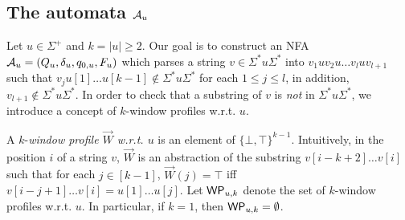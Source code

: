 \documentclass{llncs}
\begin{document}
\subsection{The automata $\mathcal{A}_u$}

Let $u \in \Sigma^+$ and $k=|u| \ge 2$.
Our goal is to construct an NFA $\mathcal{A}_u=(Q_u, \delta_u, q_{0,u}, F_u)$ which parses a string $v \in \Sigma^\ast u \Sigma^\ast$ into $v_1 u v_2 u \dots v_l u v_{l+1}$ such that $v_j u[1] \dots u[k-1] \not \in \Sigma^\ast u \Sigma^\ast$ for each $1 \le j \le l$, in addition, $v_{l+1} \not \in \Sigma^\ast u \Sigma^\ast$. 
In order to check that a substring of $v$ is \emph{not} in $\Sigma^\ast u \Sigma^\ast$, we introduce a concept of $k$-window profiles w.r.t. $u$.





A $k$-\emph{window profile $\vec{W}$ w.r.t. $u$} is an element of $\{\bot,\top\}^{k-1}$. Intuitively, in the position $i$ of a string $v$, $\vec{W}$ is an abstraction of the substring $v[i-k+2] \dots v[i]$ such that for each $j \in [k-1]$, $\vec{W}(j) = \top$ iff $v[i-j+1] \dots v[i] = u[1] \dots u[j]$. Let $\mathsf{WP}_{u, k}$ denote the set of $k$-window profiles w.r.t. $u$. In particular, if $k = 1$, then $\mathsf{WP}_{u, k} = \emptyset$.
\end{document}
